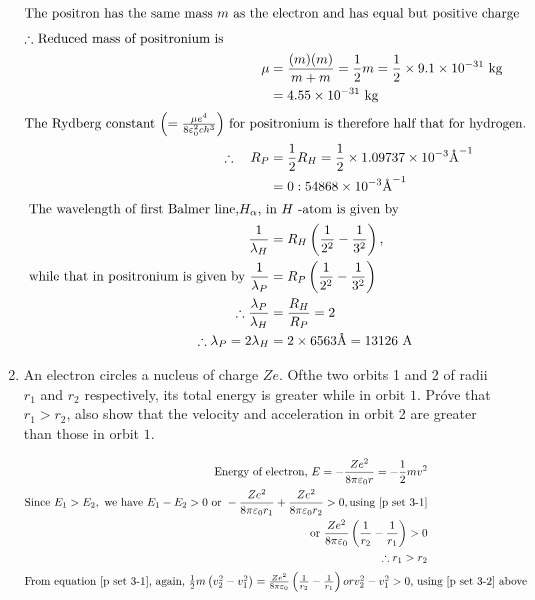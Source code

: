 \begin{enumerate}[ label=\color{ocre}\textbf{\arabic*.}]
\begin{answer}
	\begin{align*}
	\intertext{The positron has the same mass $m$ as the electron and has equal but positive charge} \intertext{$\therefore$ Reduced mass of positronium is} \mu&=\frac{(m)(m)}{m+m}=\frac{1}{2} m=\frac{1}{2} \times 9.1 \times 10^{-31} \mathrm{~kg}\\
	&=4.55 \times 10^{-31} \mathrm{~kg}\\
	\intertext{The Rydberg constant $\left(=\frac{\mu e^{4}}{8 \varepsilon_{0}^{2} c h^{3}}\right)$ for positronium is therefore half that for hydrogen.}
	\therefore \quad R_{P}&=\frac{1}{2} R_{H}=\frac{1}{2} \times 1.09737 \times 10^{-3} \text{\AA}^{-1}\\
	&=0: 54868 \times 10^{-3} \text{\AA}^{-1}\\
\intertext{	The wavelength of first Balmer line,$H_{\alpha}$, in $H$ -atom is given by}
 \frac{1}{\lambda_{H}}&=R_{H}\left(\frac{1}{2^{2}}-\frac{1}{3^{2}}\right),\\\text{ while that in positronium }
\text{is given by }\frac{1}{\lambda_{P}}&=R_{P}\left(\frac{1}{2^{2}}-\frac{1}{3^{2}}\right)
\\\therefore \frac{\lambda_{P}}{\lambda_{H}}&=\frac{R_{H}}{R_{P}}=2\\
\therefore \lambda_{P}=2 \lambda_{H}&=2 \times 6563 \text{\AA}=13126 \mathrm{~A}
	\end{align*}
\end{answer}
\item  An electron circles a nucleus of charge $Z e .$ Ofthe two orbits 1 and 2 of radii $r_{1}$ and $r_{2}$ respectively, its total energy is greater while in orbit $1 .$ Próve that $r_{1}>r_{2}$, also show that the velocity and acceleration in orbit 2 are greater than those in orbit $1 .$
\begin{answer}
\begin{align}
\text{Energy of electron, }E=-\frac{Z e^{2}}{8 \pi \varepsilon_{0} r}=-\frac{1}{2} m v^{2}\label{p set 3-1}\\
\text{Since }E_{1}>E_{2},\text{ we have }E_{1}-E_{2}>0\text{ or }-\frac{Z e^{2}}{8 \pi \varepsilon_{0} r_{1}}+\frac{Z e^{2}}{8 \pi \varepsilon_{0} r_{2}}>0,\text{using \ref{p set 3-1}}\\
\text{ or }\frac{Z e^{2}}{8 \pi \varepsilon_{0}}\left(\frac{1}{r_{2}}-\frac{1}{r_{1}}\right)>0 \label{p set 3-2}\\
\therefore r_{1}>r_{2}\\
\intertext{From equation  \ref{p set 3-1}, again, $\frac{1}{2} m\left(v_{2}^{2}-v_{1}^{2}\right)=\frac{Z e^{2}}{8 \pi \varepsilon_{0}}\left(\frac{1}{r_{2}}-\frac{1}{r_{1}}\right) or v_{2}^{2}-v_{1}^{2}>0$, using \ref{p set 3-2} above}

\end{align}
\end{answer}
\end{enumerate}
